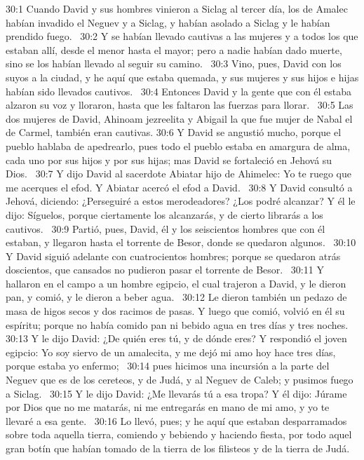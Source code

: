 30:1 Cuando David y sus hombres vinieron a Siclag al tercer día, los de Amalec habían invadido el Neguev y a Siclag, y habían asolado a Siclag y le habían prendido fuego.  
30:2 Y se habían llevado cautivas a las mujeres y a todos los que estaban allí, desde el menor hasta el mayor; pero a nadie habían dado muerte, sino se los habían llevado al seguir su camino.  
30:3 Vino, pues, David con los suyos a la ciudad, y he aquí que estaba quemada, y sus mujeres y sus hijos e hijas habían sido llevados cautivos.  
30:4 Entonces David y la gente que con él estaba alzaron su voz y lloraron, hasta que les faltaron las fuerzas para llorar.  
30:5 Las dos mujeres de David, Ahinoam jezreelita y Abigail la que fue mujer de Nabal el de Carmel, también eran cautivas. 
30:6 Y David se angustió mucho, porque el pueblo hablaba de apedrearlo, pues todo el pueblo estaba en amargura de alma, cada uno por sus hijos y por sus hijas; mas David se fortaleció en Jehová su Dios.  
30:7 Y dijo David al sacerdote Abiatar hijo de Ahimelec: Yo te ruego que me acerques el efod. Y Abiatar acercó el efod a David.  
30:8 Y David consultó a Jehová, diciendo: ¿Perseguiré a estos merodeadores? ¿Los podré alcanzar? Y él le dijo: Síguelos, porque ciertamente los alcanzarás, y de cierto librarás a los cautivos.  
30:9 Partió, pues, David, él y los seiscientos hombres que con él estaban, y llegaron hasta el torrente de Besor, donde se quedaron algunos.  
30:10 Y David siguió adelante con cuatrocientos hombres; porque se quedaron atrás doscientos, que cansados no pudieron pasar el torrente de Besor.  
30:11 Y hallaron en el campo a un hombre egipcio, el cual trajeron a David, y le dieron pan, y comió, y le dieron a beber agua.  
30:12 Le dieron también un pedazo de masa de higos secos y dos racimos de pasas. Y luego que comió, volvió en él su espíritu; porque no había comido pan ni bebido agua en tres días y tres noches.  
30:13 Y le dijo David: ¿De quién eres tú, y de dónde eres? Y respondió el joven egipcio: Yo soy siervo de un amalecita, y me dejó mi amo hoy hace tres días, porque estaba yo enfermo;  
30:14 pues hicimos una incursión a la parte del Neguev que es de los cereteos, y de Judá, y al Neguev de Caleb; y pusimos fuego a Siclag.  
30:15 Y le dijo David: ¿Me llevarás tú a esa tropa? Y él dijo: Júrame por Dios que no me matarás, ni me entregarás en mano de mi amo, y yo te llevaré a esa gente.  
30:16 Lo llevó, pues; y he aquí que estaban desparramados sobre toda aquella tierra, comiendo y bebiendo y haciendo fiesta, por todo aquel gran botín que habían tomado de la tierra de los filisteos y de la tierra de Judá.  
